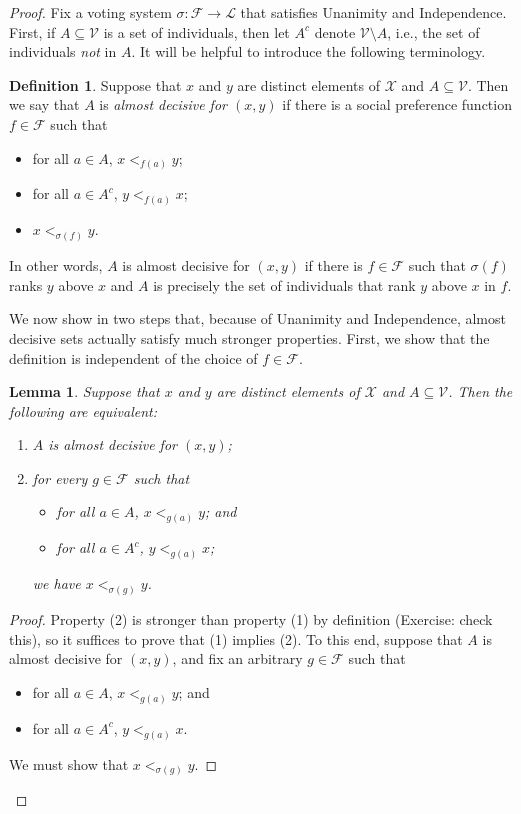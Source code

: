 \documentclass[a4paper]{memoir}
\newtheorem{lemma}[theorem]{Lemma}
\theoremstyle{definition}
\newtheorem{definition}[theorem]{Definition}
\newcommand{\mc}{\mathcal}
\newcommand{\ra}{\rightarrow}
\begin{document}
\begin{proof}
  Fix a voting system $\sigma : \mc{F} \ra \mc{L}$ that satisfies Unanimity and Independence. 
  First, if $A \subseteq \mc{V}$ is a set of individuals, then let $A^c$ denote 
  $\mc{V} \setminus A$, i.e., the set of individuals \emph{not} in $A$.
  It will be helpful to introduce the following terminology.
  
  \begin{definition}
    Suppose that $x$ and $y$ are distinct elements of $\mc{X}$ and $A \subseteq \mc{V}$. 
    Then we say that $A$ is \emph{almost decisive for $(x,y)$} if there is a social 
    preference function $f \in \mc{F}$ such that
    \begin{itemize}
      \item for all $a \in A$, $x <_{f(a)} y$;
      \item for all $a \in A^c$, $y <_{f(a)} x$;
      \item $x <_{\sigma(f)} y$.
    \end{itemize}
    In other words, $A$ is almost decisive for $(x,y)$ if there is $f \in \mc{F}$ such that 
    $\sigma(f)$ ranks $y$ above $x$ and $A$ is precisely the set of individuals that 
    rank $y$ above $x$ in $f$.
  \end{definition}
  
  We now show in two steps that, because of Unanimity and Independence, almost decisive sets 
  actually satisfy much stronger properties. First, we show that the definition is independent 
  of the choice of $f \in \mc{F}$.
  
  \begin{lemma} \label{lemma: almost decisive}
    Suppose that $x$ and $y$ are distinct elements of $\mc{X}$ and $A \subseteq \mc{V}$. 
    Then the following are equivalent:
    \begin{enumerate}
      \item $A$ is almost decisive for $(x,y)$;
      \item for \emph{every} $g \in \mc{F}$ such that
      \begin{itemize}
        \item for all $a \in A$, $x <_{g(a)} y$; and
        \item for all $a \in A^c$, $y <_{g(a)} x$;
      \end{itemize}
      we have $x <_{\sigma(g)} y$.
    \end{enumerate}
  \end{lemma}
  
  \begin{proof}
    Property (2) is stronger than property (1) by definition (Exercise: check this), 
    so it suffices to prove that (1) implies (2). To this end, suppose that $A$ is 
    almost decisive for $(x,y)$, and fix an arbitrary $g \in \mc{F}$ such that
    \begin{itemize}
      \item for all $a \in A$, $x <_{g(a)} y$; and
      \item for all $a \in A^c$, $y <_{g(a)} x$.
    \end{itemize}
    We must show that $x <_{\sigma(g)} y$.   
    

\end{proof}
\end{proof}
\end{document}
